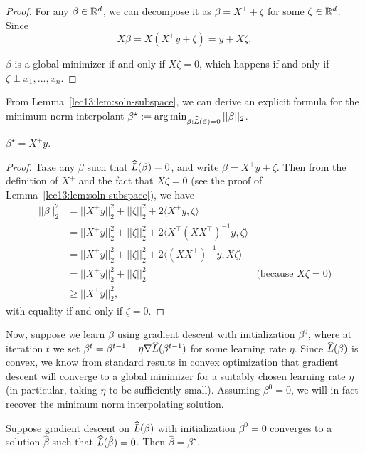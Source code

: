 \begin{proof}
For any $\beta \in \mathbb R^d$, we can decompose it as $\beta = X^+ + \zeta$ for some $\zeta \in \mathbb R^d$. Since
\begin{equation}
X\beta = X (X^+ y + \zeta) = y + X\zeta,
\end{equation}

$\beta$ is a global minimizer if and only if $X\zeta = 0$, which happens if and only if $\zeta \perp x_1,...,x_n$.

\end{proof}

From Lemma~\ref{lec13:lem:soln-subspace}, we can derive an explicit formula for the minimum norm interpolant $\beta^\star := \arg \min_{\beta : \widehat{L}(\beta) = 0} ||\beta||_2$.
\begin{corollary}
$\beta^\star = X^+ y$.
\end{corollary}

\begin{proof}
Take any $\beta$ such that $\widehat{L}(\beta) = 0$, and write $\beta = X^+ y + \zeta$. Then from the definition of $X^+$ and the fact that $X \zeta = 0$ (see the proof of Lemma~\ref{lec13:lem:soln-subspace}), we have 
\begin{align}
    ||\beta||_2^2 &= ||X^+ y||_2^2 + ||\zeta||_2^2 + 2 \langle X^+ y, \zeta \rangle \\
    &= ||X^+ y||_2^2 + ||\zeta||_2^2 + 2 \langle X^\top(X X^\top)^{-1} y, \zeta \rangle \\
    &= ||X^+ y||_2^2 + ||\zeta||_2^2 + 2 \langle (X X^\top)^{-1} y, X \zeta \rangle \\
    &= ||X^+ y||_2^2 + ||\zeta||_2^2 &\text{(because $X\zeta = 0$)} \\
    &\geq ||X^+ y||_2^2,
\end{align}
with equality if and only if $\zeta = 0$.

\end{proof}

Now, suppose we learn $\beta$ using gradient descent with initialization $\beta^0$, where at iteration $t$ we set $\beta^t = \beta^{t-1} - \eta \nabla \widehat{L}(\beta^{t-1})$ for some learning rate $\eta$. Since $\widehat{L} (\beta)$ is convex, we know from standard results in convex optimization that gradient descent will converge to a global minimizer for a suitably chosen learning rate $\eta$ (in particular, taking $\eta$ to be sufficiently small). Assuming $\beta^0 = 0$, we will in fact recover the minimum norm interpolating solution.
\begin{theorem}\label{lec13:thm:linear-main}
Suppose gradient descent on $\widehat{L}(\beta)$ with initialization $\beta^0 = 0$ converges to a solution $\hat \beta$ such that $\widehat{L}(\hat \beta) = 0$. Then $\hat \beta = \beta^\star$.
\end{theorem}

